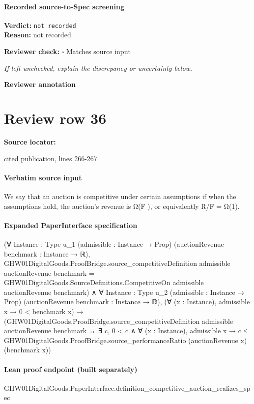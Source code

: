 \documentclass[10pt]{article}
\newcommand{\reviewerbox}{%
  \par\noindent\fbox{\parbox{0.96\linewidth}{\rule{0pt}{0.38in}}}\par
}
\newcommand{\reviewmatch}[1]{%
  \par\noindent\textbf{Reviewer check:} $\square$\; #1\par
  \noindent\emph{If left unchecked, explain the discrepancy or uncertainty below.}\par
}
\begin{document}
\paragraph{Recorded source-to-Spec screening}
\textbf{Verdict:} \texttt{not recorded}
\\
\textbf{Reason:} not recorded
\reviewmatch{Matches source input}
\noindent\textbf{Reviewer annotation}\par
\reviewerbox
\clearpage
\hypertarget{source-claim-4ea45a9e13ad5c07}{}
\section*{Review row 36}
\textbf{Source locator:} {\footnotesize\raggedright cited publication, lines 266-\allowbreak{}267\par}
\paragraph{Verbatim source input}
\begin{ReviewVerbatim}
We say that an auction is competitive under certain
assumptions if when the assumptions hold, the auction’s revenue is Ω(F ), or equivalently R/F = Ω(1).
\end{ReviewVerbatim}


\paragraph{Expanded PaperInterface specification}
\begin{ReviewVerbatim}
(∀ {Instance : Type u_1} (admissible : Instance → Prop) (auctionRevenue benchmark : Instance → ℝ),
    GHW01DigitalGoods.ProofBridge.source_competitiveDefinition admissible auctionRevenue benchmark =
      GHW01DigitalGoods.SourceDefinitions.CompetitiveOn admissible auctionRevenue benchmark) ∧
  ∀ {Instance : Type u_2} (admissible : Instance → Prop) (auctionRevenue benchmark : Instance → ℝ),
    (∀ (x : Instance), admissible x → 0 < benchmark x) →
      (GHW01DigitalGoods.ProofBridge.source_competitiveDefinition admissible auctionRevenue benchmark ↔
        ∃ c,
          0 < c ∧
            ∀ (x : Instance),
              admissible x → c ≤ GHW01DigitalGoods.ProofBridge.source_performanceRatio (auctionRevenue x) (benchmark x))
\end{ReviewVerbatim}

\paragraph{Lean proof endpoint (built separately)}\begin{ReviewVerbatim}
GHW01DigitalGoods.PaperInterface.definition_competitive_auction_realizes_spec
\end{ReviewVerbatim}
\end{document}
